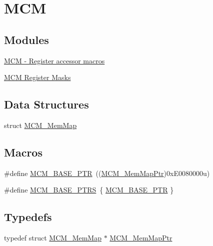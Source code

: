 \hypertarget{group___m_c_m___peripheral}{}\section{M\+C\+M}
\label{group___m_c_m___peripheral}
\subsection*{Modules}
\begin{DoxyCompactItemize}
\item 
\hyperlink{group___m_c_m___register___accessor___macros}{M\+C\+M -\/ Register accessor macros}
\item 
\hyperlink{group___m_c_m___register___masks}{M\+C\+M Register Masks}
\end{DoxyCompactItemize}
\subsection*{Data Structures}
\begin{DoxyCompactItemize}
\item 
struct \hyperlink{struct_m_c_m___mem_map}{M\+C\+M\+\_\+\+Mem\+Map}
\end{DoxyCompactItemize}
\subsection*{Macros}
\begin{DoxyCompactItemize}
\item 
\#define \hyperlink{group___m_c_m___peripheral_gad41e931f176c230831e3dbad45117841}{M\+C\+M\+\_\+\+B\+A\+S\+E\+\_\+\+P\+T\+R}~((\hyperlink{group___m_c_m___peripheral_ga72e8bbe428d9410917903164d3a5f675}{M\+C\+M\+\_\+\+Mem\+Map\+Ptr})0x\+E0080000u)
\item 
\#define \hyperlink{group___m_c_m___peripheral_gae2d5e838ce7d2d4108738c05bf224272}{M\+C\+M\+\_\+\+B\+A\+S\+E\+\_\+\+P\+T\+R\+S}~\{ \hyperlink{group___m_c_m___peripheral_gad41e931f176c230831e3dbad45117841}{M\+C\+M\+\_\+\+B\+A\+S\+E\+\_\+\+P\+T\+R} \}
\end{DoxyCompactItemize}
\subsection*{Typedefs}
\begin{DoxyCompactItemize}
\item 
typedef struct \hyperlink{struct_m_c_m___mem_map}{M\+C\+M\+\_\+\+Mem\+Map} $\ast$ \hyperlink{group___m_c_m___peripheral_ga72e8bbe428d9410917903164d3a5f675}{M\+C\+M\+\_\+\+Mem\+Map\+Ptr}
\end{DoxyCompactItemize}


